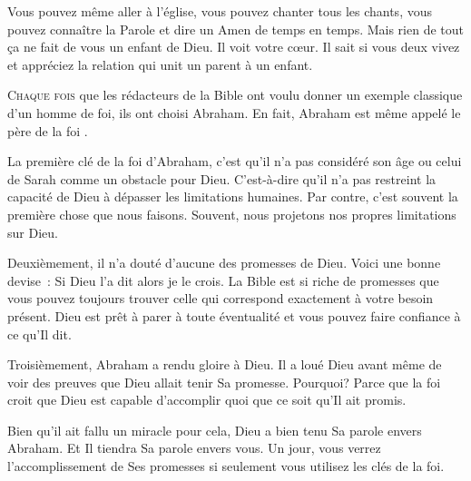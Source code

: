 Vous pouvez même aller à l'église, vous pouvez chanter tous les chants,
 vous pouvez connaître la Parole et dire un \Og Amen \Fg{} de temps en temps.
 Mais rien de tout \c{c}a ne fait de vous un enfant de Dieu.
 Il voit votre c\oe{}ur. Il sait si vous deux vivez et appréciez
 la relation qui unit un parent à un enfant.

\dvrule






\lettrine{C}{haque fois} que les rédacteurs de la Bible ont voulu
 donner un exemple classique d'un homme de foi, ils ont choisi Abraham.
 En fait, Abraham est même appelé \Og le père de la foi \Fg{}.

La première clé de la foi d'Abraham, c'est qu'il n'a pas considéré
 son âge ou celui de Sarah comme un obstacle pour Dieu.
 C'est-à-dire qu'il n'a pas restreint la capacité de Dieu
 à dépasser les limitations humaines.
 Par contre, c'est souvent la première chose que nous faisons.
 Souvent, nous projetons nos propres limitations sur Dieu.

Deuxièmement, il n'a douté d'aucune des promesses de Dieu.
 Voici une bonne devise~: \Og Si Dieu l'a dit alors je le crois. \Fg{}
 La Bible est si riche de promesses que vous pouvez toujours trouver
 celle qui correspond exactement à votre besoin présent.
 Dieu est prêt à parer à toute éventualité et vous pouvez
 faire confiance à ce qu'Il dit.

Troisièmement, Abraham a rendu gloire à Dieu.
 Il a loué Dieu avant même de voir des preuves que Dieu
 allait tenir Sa promesse. Pourquoi? Parce que la foi croit
 que Dieu est capable d'accomplir quoi que ce soit qu'Il ait promis.


Bien qu'il ait fallu un miracle pour cela, Dieu a bien tenu Sa parole
 envers Abraham. Et Il tiendra Sa parole envers vous.
 Un jour, vous verrez l'accomplissement de Ses promesses
 si seulement vous utilisez les clés de la foi.

